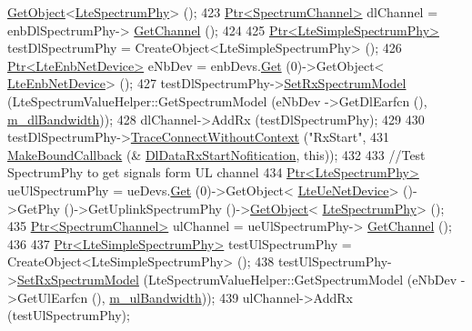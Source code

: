 \begin{DoxyCode}
      \hyperlink{classns3_1_1Object_a13e18c00017096c8381eb651d5bd0783}{GetObject}<\hyperlink{classns3_1_1LteSpectrumPhy}{LteSpectrumPhy}> ();
423   \hyperlink{classns3_1_1Ptr}{Ptr<SpectrumChannel>} dlChannel = enbDlSpectrumPhy->
      \hyperlink{classns3_1_1LteSpectrumPhy_a50f13e43568687ee32c5d63e5bf639c2}{GetChannel} ();
424 
425   \hyperlink{classns3_1_1Ptr}{Ptr<LteSimpleSpectrumPhy>} testDlSpectrumPhy = CreateObject<LteSimpleSpectrumPhy>
       ();
426   \hyperlink{classns3_1_1Ptr}{Ptr<LteEnbNetDevice>} eNbDev = enbDevs.\hyperlink{classns3_1_1NetDeviceContainer_a677d62594b5c9d2dea155cc5045f4d0b}{Get} (0)->GetObject<
      \hyperlink{classns3_1_1LteEnbNetDevice}{LteEnbNetDevice}> ();
427   testDlSpectrumPhy->\hyperlink{classns3_1_1LteSimpleSpectrumPhy_a1cbc14b5951a6c9360d3b180760429d9}{SetRxSpectrumModel} (LteSpectrumValueHelper::GetSpectrumModel (eNbDev
      ->GetDlEarfcn (), \hyperlink{classLteFrTestCase_ab4b1f8a24761500e981be4188f37e4a7}{m\_dlBandwidth}));
428   dlChannel->AddRx (testDlSpectrumPhy);
429 
430   testDlSpectrumPhy->\hyperlink{classns3_1_1ObjectBase_a1be45f6fd561e75dcac9dfa81b2b81e4}{TraceConnectWithoutContext} (\textcolor{stringliteral}{"RxStart"},
431                                                  \hyperlink{group__makeboundcallback_ga1725d6362e6065faa0709f7c93f8d770}{MakeBoundCallback} (&
      \hyperlink{lte-test-frequency-reuse_8cc_aaf568764de648457da3536a8940a8510}{DlDataRxStartNofitication}, \textcolor{keyword}{this}));
432 
433   \textcolor{comment}{//Test SpectrumPhy to get signals form UL channel}
434   \hyperlink{classns3_1_1Ptr}{Ptr<LteSpectrumPhy>} ueUlSpectrumPhy = ueDevs.\hyperlink{classns3_1_1NetDeviceContainer_a677d62594b5c9d2dea155cc5045f4d0b}{Get} (0)->GetObject<
      \hyperlink{classns3_1_1LteUeNetDevice}{LteUeNetDevice}> ()->GetPhy ()->GetUplinkSpectrumPhy ()->\hyperlink{classns3_1_1Object_a13e18c00017096c8381eb651d5bd0783}{GetObject}<
      \hyperlink{classns3_1_1LteSpectrumPhy}{LteSpectrumPhy}> ();
435   \hyperlink{classns3_1_1Ptr}{Ptr<SpectrumChannel>} ulChannel = ueUlSpectrumPhy->
      \hyperlink{classns3_1_1LteSpectrumPhy_a50f13e43568687ee32c5d63e5bf639c2}{GetChannel} ();
436 
437   \hyperlink{classns3_1_1Ptr}{Ptr<LteSimpleSpectrumPhy>} testUlSpectrumPhy = CreateObject<LteSimpleSpectrumPhy>
       ();
438   testUlSpectrumPhy->\hyperlink{classns3_1_1LteSimpleSpectrumPhy_a1cbc14b5951a6c9360d3b180760429d9}{SetRxSpectrumModel} (LteSpectrumValueHelper::GetSpectrumModel (eNbDev
      ->GetUlEarfcn (), \hyperlink{classLteFrTestCase_abc41d1a6e64783aec279b400fc5e0076}{m\_ulBandwidth}));
439   ulChannel->AddRx (testUlSpectrumPhy);

\end{DoxyCode}
